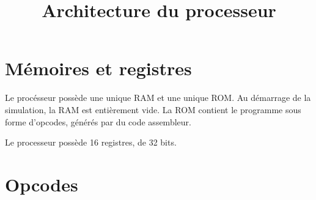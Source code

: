 \documentclass[a4paper]{article}
\title{Architecture du processeur}
\begin{document}
\maketitle

\section{Mémoires et registres}

Le procésseur possède une unique RAM et une unique ROM. Au démarrage de la
simulation, la RAM est entièrement vide. La ROM contient le programme sous forme
d'opcodes, générés par du code assembleur.

Le processeur possède 16 registres, de 32 bits.

\section{Opcodes}
\end{document}
